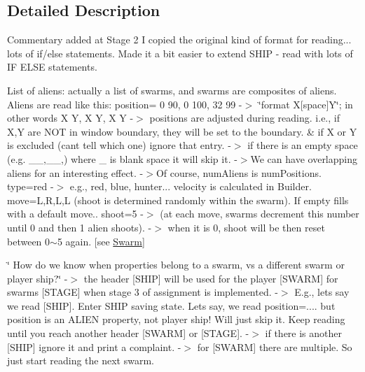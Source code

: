 \subsection{Detailed Description}
Commentary added at Stage 2 I copied the original kind of format for reading... lots of if/else statements. Made it a bit easier to extend S\+H\+IP -\/ read with lots of IF E\+L\+SE statements. 

 List of aliens\+: actually a list of swarms, and swarms are composites of aliens. Aliens are read like this\+: position= 0 90, 0 100, 32 99 -\/$>$ \char`\"{}format X\mbox{[}space\mbox{]}\+Y\char`\"{}; in other words X Y, X Y, X Y -\/$>$ positions are adjusted during reading. i.\+e., if X,Y are N\+OT in window boundary, they will be set to the boundary. \& if X or Y is excluded (can\textquotesingle{}t tell which one) ignore that entry. -\/$>$ if there is an empty space (e.\+g. \textquotesingle{}\+\_\+\+\_\+,\+\_\+\+\_\+,\textquotesingle{}) where \+\_\+ is blank space it will skip it. -\/$>$We can have overlapping aliens for an interesting effect. -\/$>$Of course, num\+Aliens is num\+Positions. type=red -\/$>$ e.\+g., red, blue, hunter... velocity is calculated in Builder. move=L,R,L,L (shoot is determined randomly within the swarm). If empty fills with a default move.. shoot=5 -\/$>$ (at each move, swarms decrement this number until 0 and then 1 alien shoots). -\/$>$ when it is 0, shoot will be then reset between 0$\sim$5 again. \mbox{[}see \hyperlink{classgame_1_1Swarm}{Swarm}\mbox{]} 

 \char`\"{} How do we know when properties belong to a swarm, vs a different swarm or
player ship?\char`\"{} -\/$>$ the header \mbox{[}S\+H\+IP\mbox{]} will be used for the player \mbox{[}S\+W\+A\+RM\mbox{]} for swarms \mbox{[}S\+T\+A\+GE\mbox{]} when stage 3 of assignment is implemented. -\/$>$ E.\+g., let\textquotesingle{}s say we read \mbox{[}S\+H\+IP\mbox{]}. Enter \textquotesingle{}S\+H\+IP\textquotesingle{} saving state. Lets say, we read position=.... but position is an A\+L\+I\+EN property, not player ship! Will just skip it. Keep reading until you reach another header \mbox{[}S\+W\+A\+RM\mbox{]} or \mbox{[}S\+T\+A\+GE\mbox{]}. -\/$>$ if there is another \mbox{[}S\+H\+IP\mbox{]} ignore it and print a complaint. -\/$>$ for \mbox{[}S\+W\+A\+RM\mbox{]} there are multiple. So just start reading the next swarm. 